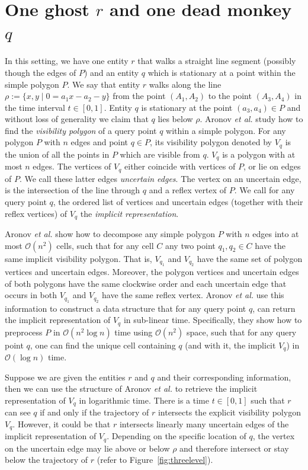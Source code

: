 \documentclass[a4paper, UKenglish]{lipics-v2018}
\newcommand{\etal}{\textit{et al.}\xspace}
\begin{document}
\section{One ghost $r$ and one dead monkey $q$}

In this setting, we have one entity $r$ that walks a straight line segment (possibly though the edges of $P$) and an entity $q$ which is stationary at a point within the simple polygon $P$.
We say that entity $r$ walks along the line $\rho := \{ x,y \mid  0 = a_1 x - a_2 - y \}$ from the point $(A_1, A_2)$ to the point $(A_3, A_4)$ in the time interval $t \in [0,1]$. Entity $q$ is stationary at the point $(a_3, a_4) \in P$ and without loss of generality we claim that $q$ lies below $\rho$. 
Aronov \etal \cite{Aronov2002} study how to find the \emph{visibility polygon} of a query point $q$ within a simple polygon. For any polygon $P$ with $n$ edges and point $q \in P$, its visibility polygon denoted by $V_q$ is the union of all the points in $P$ which are visible from $q$. $V_q$ is a polygon with at most $n$ edges. The vertices of $V_q$ either coincide with vertices of $P$, or lie on edges of $P$. We call these latter edges \emph{uncertain edges}. The vertex on an uncertain edge, is the intersection of the line through $q$ and a reflex vertex of $P$. We call for any query point $q$, the ordered list of vertices and uncertain edges (together with their reflex vertices) of $V_q$ the \emph{implicit representation}.

Aronov \etal show how to decompose any simple polygon $P$ with $n$ edges into at most $\mathcal{O}(n^2)$ cells, such that for any cell $C$ any two point $q_1, q_2 \in C$ have the same implicit visibility polygon. That is, $V_{q_1}$ and $V_{q_2}$ have the same set of polygon vertices and uncertain edges. Moreover, the polygon vertices and uncertain edges of both polygons have the same clockwise order and each uncertain edge that occurs in both $V_{q_1}$ and $V_{q_2}$ have the same reflex vertex. Aronov \etal use this information to construct a data structure that for any query point $q$, can return the implicit representation of $V_q$ in sub-linear time. Specifically, they show how to preprocess $P$ in $\mathcal{O}(n^2 \log n)$ time using $\mathcal{O}(n^2)$ space, such that for any query point $q$, one can find the unique cell containing $q$ (and with it, the implicit $V_q$) in $\mathcal{O}(\log n)$ time.

Suppose we are given the entities $r$ and $q$ and their corresponding information, then we can use the structure of Aronov \etal to retrieve the implicit representation of $V_q$ in logarithmic time. There is a time $t \in [0,1]$ such that $r$ can see $q$ if and only if the trajectory of $r$ intersects the explicit visibility polygon $V_q$. However, it could be that $r$ intersects linearly many uncertain edges of the implicit representation of $V_q$. Depending on the specific location of $q$, the vertex on the uncertain edge may lie above or below $\rho$ and therefore intersect or stay below the trajectory of $r$ (refer to Figure~\ref{fig:threelevel}). 
\end{document}
